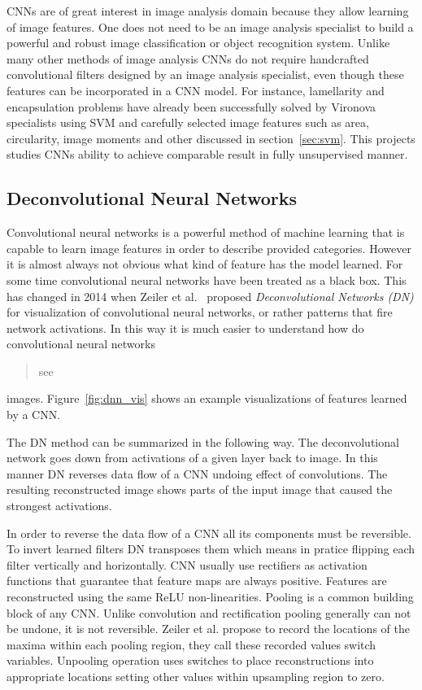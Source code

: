 \documentclass[a4paper, 11pt, table]{article}
\begin{document}
CNNs are of great interest in image analysis domain because they allow learning of image features. One does not need to be an image analysis specialist to build a powerful and robust image classification or object recognition system. Unlike many other methods of image analysis CNNs do not require handcrafted convolutional filters designed by an image analysis specialist, even though these features can be incorporated in a CNN model. For instance, lamellarity and encapsulation problems have already been successfully solved by Vironova specialists using SVM and carefully selected image features such as area, circularity, image moments and other discussed in section~\ref{sec:svm}. This projects studies CNNs ability to achieve comparable result in fully unsupervised manner. 


\subsection{Deconvolutional Neural Networks}
Convolutional neural networks is a powerful method of machine learning that is capable to learn image features in order to describe provided categories. However it is almost always not obvious what kind of feature has the model learned. For some time convolutional neural networks have been treated as a black box. This has changed in 2014 when Zeiler et al.~\cite{Zeiler2014} proposed \textit{Deconvolutional Networks (DN)} for visualization of convolutional  neural networks, or rather patterns that fire network activations. In this way it is much easier to understand how do convolutional neural networks \blockquote{see} images. Figure~\ref{fig:dnn_vis} shows an example visualizations of features learned by a CNN. 

The DN method can be summarized in the following way. The deconvolutional network goes down from activations of a given layer back to image. In this manner DN reverses data flow of a CNN undoing effect of convolutions. The resulting reconstructed image shows parts of the input image that caused the strongest activations. 

In order to reverse the data flow of a CNN all its components must be reversible. To invert learned filters DN transposes them which means in pratice flipping each filter vertically and horizontally. CNN usually use rectifiers as activation functions that guarantee that feature maps are always positive. Features are reconstructed using the same ReLU non-linearities. Pooling is a common building block of any CNN. Unlike convolution and rectification pooling generally can not be undone, it is not reversible. Zeiler et al. propose to record the locations of the maxima within each pooling region, they call these recorded values switch variables. Unpooling operation uses switches to place reconstructions into appropriate locations setting other values within upsampling region to zero.
\end{document}
